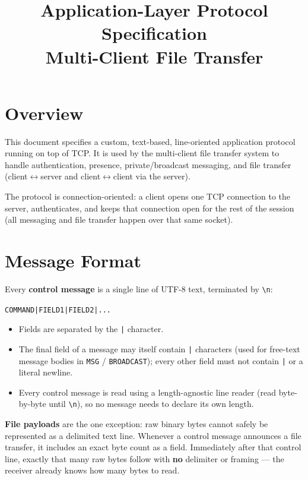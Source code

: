 \documentclass[11pt]{article}
\title{Application-Layer Protocol Specification\\
\large Multi-Client File Transfer}
\author{}
\date{}
\newcommand{\cmd}[1]{\texttt{#1}}
\begin{document}
\maketitle

\section{Overview}

This document specifies a custom, text-based, line-oriented application
protocol running on top of TCP. It is used by the multi-client file
transfer system to handle authentication, presence, private/broadcast
messaging, and file transfer (client$\leftrightarrow$server and
client$\leftrightarrow$client via the server).

The protocol is connection-oriented: a client opens one TCP connection to
the server, authenticates, and keeps that connection open for the rest of
the session (all messaging and file transfer happen over that same
socket).

\section{Message Format}

Every \textbf{control message} is a single line of UTF-8 text, terminated
by \cmd{\textbackslash{}n}:

\begin{center}
\texttt{COMMAND|FIELD1|FIELD2|...}
\end{center}

\begin{itemize}[leftmargin=1.5em]
  \item Fields are separated by the \cmd{|} character.
  \item The final field of a message may itself contain \cmd{|}
        characters (used for free-text message bodies in \cmd{MSG} /
        \cmd{BROADCAST}); every other field must not contain \cmd{|} or a
        literal newline.
  \item Every control message is read using a length-agnostic line
        reader (read byte-by-byte until \cmd{\textbackslash{}n}), so no
        message needs to declare its own length.
\end{itemize}

\textbf{File payloads} are the one exception: raw binary bytes cannot
safely be represented as a delimited text line. Whenever a control
message announces a file transfer, it includes an exact byte count as a
field. Immediately after that control line, exactly that many raw bytes
follow with \textbf{no} delimiter or framing --- the receiver already
knows how many bytes to read.
\end{document}
